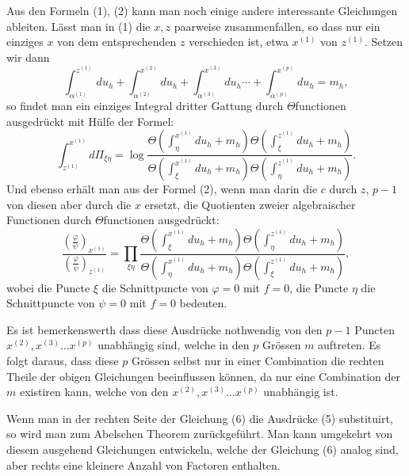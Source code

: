 \documentclass[10pt]{article}
\begin{document}
Aus den Formeln (1), (2) kann man noch einige andere interessante Gleichungen ableiten. Lässt man in (1) die \(x,z\) paarweise zusammenfallen, so dass nur ein einziges \(x\) von dem entsprechenden \(z\) verschieden ist, etwa \(x^{(1)}\) von \(z^{(1)}\). Setzen wir dann
\[
\int_{\alpha^{(1)}}^{z^{(1)}}du_h+\int_{\alpha^{(2)}}^{x^{(2)}}du_h+\int_{\alpha^{(3)}}^{x^{(3)}}du_h\cdots+\int_{\alpha^{(p)}}^{x^{(p)}}du_h=m_h,
\]
so findet man ein einziges Integral dritter Gattung durch \(\Theta\)functionen ausgedrückt mit Hülfe der Formel:
\[
\tag{5}
\int_{z^{(1)}}^{x^{(1)}}d\Pi_{\xi\eta}
=\log\frac{
\Theta\!\left(\int_{\eta}^{x^{(1)}}du_h+m_h\right)
\Theta\!\left(\int_{\xi}^{z^{(1)}}du_h+m_h\right)}
{\Theta\!\left(\int_{\xi}^{x^{(1)}}du_h+m_h\right)
\Theta\!\left(\int_{\eta}^{z^{(1)}}du_h+m_h\right)}.
\]
Und ebenso erhält man aus der Formel (2), wenn man darin die \(c\) durch \(z\), \(p-1\) von diesen aber durch die \(x\) ersetzt, die Quotienten zweier algebraischer Functionen durch \(\Theta\)functionen ausgedrückt:
\[
\tag{6}
\frac{\left(\frac{\varphi}{\psi}\right)_{x^{(1)}}}
{\left(\frac{\varphi}{\psi}\right)_{z^{(1)}}}
=
\prod_{\xi\eta}
\frac{
\Theta\!\left(\int_{\xi}^{x^{(1)}}du_h+m_h\right)
\Theta\!\left(\int_{\eta}^{z^{(1)}}du_h+m_h\right)}
{\Theta\!\left(\int_{\eta}^{x^{(1)}}du_h+m_h\right)
\Theta\!\left(\int_{\xi}^{z^{(1)}}du_h+m_h\right)},
\]
wobei die Puncte \(\xi\) die Schnittpuncte von \(\varphi=0\) mit \(f=0\), die Puncte \(\eta\) die Schnittpuncte von \(\psi=0\) mit \(f=0\) bedeuten.

Es ist bemerkenswerth dass diese Ausdrücke nothwendig von den \(p-1\) Puncten \(x^{(2)},x^{(3)}\ldots x^{(p)}\) unabhängig sind, welche in den \(p\) Grössen \(m\) auftreten. Es folgt daraus, dass diese \(p\) Grössen selbst nur in einer Combination die rechten Theile der obigen Gleichungen beeinflussen können, da nur eine Combination der \(m\) existiren kann, welche von den \(x^{(2)},x^{(3)}\ldots x^{(p)}\) unabhängig ist.

Wenn man in der rechten Seite der Gleichung (6) die Ausdrücke (5) substituirt, so wird man zum Abelschen Theorem zurückgeführt. Man kann umgekehrt von diesem ausgehend Gleichungen entwickeln, welche der Gleichung (6) analog sind, aber rechts eine kleinere Anzahl von Factoren enthalten.
\end{document}
